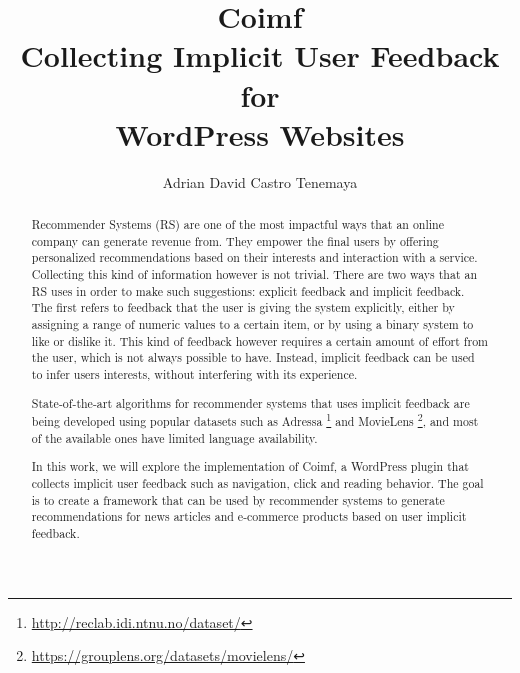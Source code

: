 \documentclass[sigconf,nonacm]{acmart}
\begin{document}
\title{Coimf \\ Collecting Implicit User Feedback for \\ WordPress Websites}

\author{Adrian David Castro Tenemaya}

\begin{abstract}
  Recommender Systems (RS) are one of the most impactful ways that an
  online company can generate revenue from. They empower the final users by
  offering personalized recommendations based on their interests and interaction
  with a service. Collecting this kind of information however is not trivial.
  There are two ways that an RS uses in order to make such suggestions: explicit
  feedback and implicit feedback. The first refers to feedback that the user
  is giving the system explicitly, either by assigning a range of numeric values
  to a certain item, or by using a binary system to like or dislike it. This
  kind of feedback however requires a certain amount of effort from the user,
  which is not always possible to have. Instead, implicit feedback can be used
  to infer users interests, without interfering with its experience.

  State-of-the-art algorithms for recommender systems that uses implicit
  feedback are being developed using popular datasets such as Adressa
  \footnote{\href{http://reclab.idi.ntnu.no/dataset/}{http://reclab.idi.ntnu.no/dataset/}}
  and MovieLens
  \footnote{\href{https://grouplens.org/datasets/movielens/}{https://grouplens.org/datasets/movielens/}},
  and most of the available ones have limited language availability.

  In this work, we will explore the implementation of Coimf, a WordPress plugin
  that collects implicit user feedback such as navigation, click and reading
  behavior. The goal is to create a framework that can be used by recommender systems
  to generate recommendations for news articles and e-commerce products
  based on user implicit feedback.
\end{abstract}
\end{document}

